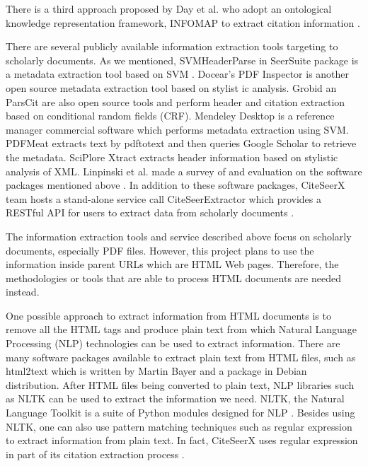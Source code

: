 \documentclass[prodmode]{acmsmall} %
\begin{document}
There is a third approach proposed by Day et al. who adopt an ontological knowledge representation framework, INFOMAP to extract citation information \cite{day2005knowledge} \cite{day2007reference}.

There are several publicly available information extraction tools targeting to scholarly documents. As we mentioned, SVMHeaderParse in SeerSuite package is a metadata extraction tool based on SVM  \cite{han2003automatic}.  Docear's PDF Inspector is another open source metadata extraction tool based on stylist ic analysis. Grobid \cite{lopez2009grobid} an ParsCit \cite{councill2008parscit} are also open source tools and perform header and citation extraction based on conditional random fields (CRF). Mendeley Desktop is a reference manager commercial software which performs metadata extraction using SVM. PDFMeat \cite{aumuller2011pdfmeat} extracts text by pdftotext and then queries Google Scholar to retrieve the metadata. SciPlore Xtract \cite{beel2010sciplore} extracts header information based on stylistic analysis of XML. Linpinski et al. made a survey of and evaluation on the software packages mentioned above \cite{lipinski2013evaluation}. In addition to these software packages, CiteSeerX team hosts a stand-alone service call CiteSeerExtractor which provides a RESTful API for users to extract data from scholarly documents \cite{williams2014scholarly}.

The information extraction tools and service described above focus on scholarly documents, especially PDF files. However, this project plans to use the information inside parent URLs which are HTML Web pages. Therefore, the methodologies or tools that are able to process HTML documents are needed instead.

One possible approach to extract information from HTML documents is to remove all the HTML tags and produce plain text from which Natural Language Processing (NLP) technologies can be used to extract information. There are many software packages available to extract plain text from HTML files, such as html2text which is written by Martin Bayer and a package in Debian distribution. After HTML files being converted to plain text, NLP libraries such as NLTK can be used to extract the information we need. NLTK, the Natural Language Toolkit is a suite of Python modules designed for NLP \cite{loper2002nltk} \cite{bird2006nltk}. Besides using NLTK, one can also use pattern matching techniques such as regular expression to extract information from plain text. In fact, CiteSeerX uses regular expression in part of its citation extraction process \cite{wu2014citeseerx}.
\end{document}
